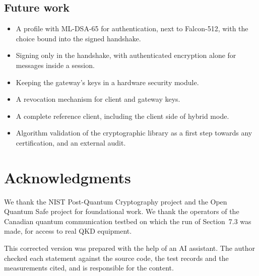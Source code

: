 \documentclass[11pt,letterpaper]{article}
\begin{document}
\subsection{Future work}
\label{sec:future}

\begin{itemize}
    \item A profile with ML-DSA-65 for authentication, next to Falcon-512, with the choice bound into the signed handshake.
    \item Signing only in the handshake, with authenticated encryption alone for messages inside a session.
    \item Keeping the gateway's keys in a hardware security module.
    \item A revocation mechanism for client and gateway keys.
    \item A complete reference client, including the client side of hybrid mode.
    \item Algorithm validation of the cryptographic library as a first step towards any certification, and an external audit.
\end{itemize}

\section*{Acknowledgments}

We thank the NIST Post-Quantum Cryptography project and the Open Quantum Safe project for foundational work. We thank the operators of the Canadian quantum communication testbed on which the run of Section~7.3 was made, for access to real QKD equipment.

This corrected version was prepared with the help of an AI assistant. The author checked each statement against the source code, the test records and the measurements cited, and is responsible for the content.
\end{document}
